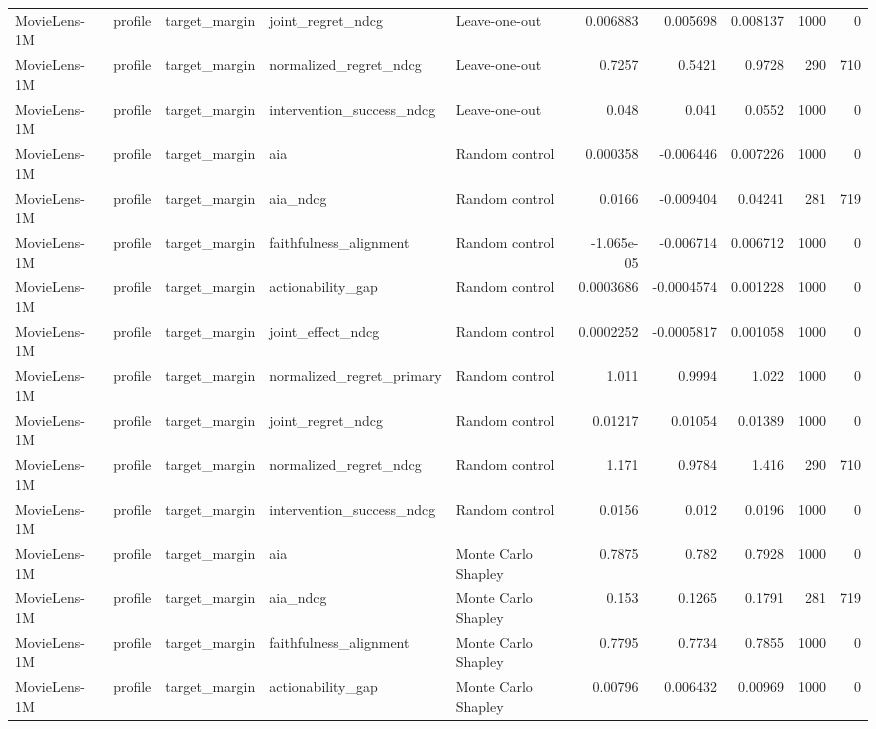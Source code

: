 \begin{table}[t]
\begin{tabular}{lllllrrrrr}
MovieLens-1M & profile & target\_margin & joint\_regret\_ndcg & Leave-one-out & 0.006883 & 0.005698 & 0.008137 & 1000 & 0 \\
MovieLens-1M & profile & target\_margin & normalized\_regret\_ndcg & Leave-one-out & 0.7257 & 0.5421 & 0.9728 & 290 & 710 \\
MovieLens-1M & profile & target\_margin & intervention\_success\_ndcg & Leave-one-out & 0.048 & 0.041 & 0.0552 & 1000 & 0 \\
MovieLens-1M & profile & target\_margin & aia & Random control & 0.000358 & -0.006446 & 0.007226 & 1000 & 0 \\
MovieLens-1M & profile & target\_margin & aia\_ndcg & Random control & 0.0166 & -0.009404 & 0.04241 & 281 & 719 \\
MovieLens-1M & profile & target\_margin & faithfulness\_alignment & Random control & -1.065e-05 & -0.006714 & 0.006712 & 1000 & 0 \\
MovieLens-1M & profile & target\_margin & actionability\_gap & Random control & 0.0003686 & -0.0004574 & 0.001228 & 1000 & 0 \\
MovieLens-1M & profile & target\_margin & joint\_effect\_ndcg & Random control & 0.0002252 & -0.0005817 & 0.001058 & 1000 & 0 \\
MovieLens-1M & profile & target\_margin & normalized\_regret\_primary & Random control & 1.011 & 0.9994 & 1.022 & 1000 & 0 \\
MovieLens-1M & profile & target\_margin & joint\_regret\_ndcg & Random control & 0.01217 & 0.01054 & 0.01389 & 1000 & 0 \\
MovieLens-1M & profile & target\_margin & normalized\_regret\_ndcg & Random control & 1.171 & 0.9784 & 1.416 & 290 & 710 \\
MovieLens-1M & profile & target\_margin & intervention\_success\_ndcg & Random control & 0.0156 & 0.012 & 0.0196 & 1000 & 0 \\
MovieLens-1M & profile & target\_margin & aia & Monte Carlo Shapley & 0.7875 & 0.782 & 0.7928 & 1000 & 0 \\
MovieLens-1M & profile & target\_margin & aia\_ndcg & Monte Carlo Shapley & 0.153 & 0.1265 & 0.1791 & 281 & 719 \\
MovieLens-1M & profile & target\_margin & faithfulness\_alignment & Monte Carlo Shapley & 0.7795 & 0.7734 & 0.7855 & 1000 & 0 \\
MovieLens-1M & profile & target\_margin & actionability\_gap & Monte Carlo Shapley & 0.00796 & 0.006432 & 0.00969 & 1000 & 0 \\

\end{tabular}
\end{table}
